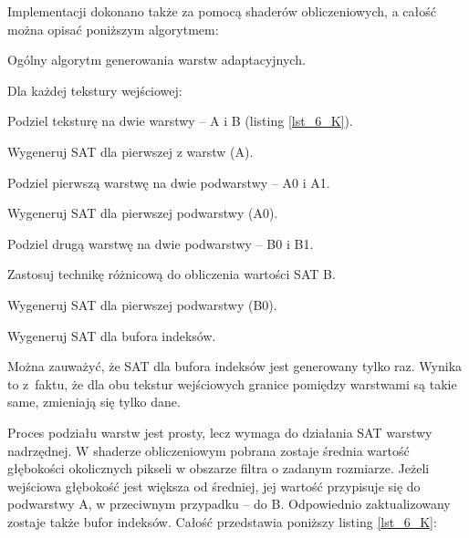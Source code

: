 		Implementacji dokonano także za pomocą shaderów obliczeniowych, a całość można opisać poniższym algorytmem:
		
		\begin{algorithm}[H]
			\label{alg_6_D}
			\caption{Ogólny algorytm generowania warstw adaptacyjnych.}	
			
			Dla każdej tekstury wejściowej:
			
			\Indp
			
				Podziel teksturę na dwie warstwy -- A i B (listing \ref{lst_6_K}).
				
				Wygeneruj SAT dla pierwszej z warstw (A).
				
				Podziel pierwszą warstwę na dwie podwarstwy -- A0 i A1.
				
				Wygeneruj SAT dla pierwszej podwarstwy (A0).
				
				Podziel drugą warstwę na dwie podwarstwy -- B0 i B1.
				
				\Indp
					
					Zastosuj technikę różnicową do obliczenia wartości SAT B.
				
				\Indm
				
				Wygeneruj SAT dla pierwszej podwarstwy (B0).
			
			\Indm
			
			Wygeneruj SAT dla bufora indeksów.
			
		\end{algorithm}
	
		Można zauważyć, że SAT dla bufora indeksów jest generowany tylko raz. Wynika to z~faktu, że dla obu tekstur wejściowych granice pomiędzy warstwami są takie same, zmieniają się tylko dane.
		
		Proces podziału warstw jest prosty, lecz wymaga do działania SAT warstwy nadrzędnej. W shaderze obliczeniowym pobrana zostaje średnia wartość głębokości okolicznych pikseli w obszarze filtra o zadanym rozmiarze. Jeżeli wejściowa głębokość jest większa od średniej, jej wartość przypisuje się do podwarstwy A, w przeciwnym przypadku -- do B. Odpowiednio zaktualizowany zostaje także bufor indeksów. Całość przedstawia poniższy listing \ref{lst_6_K}:
		
